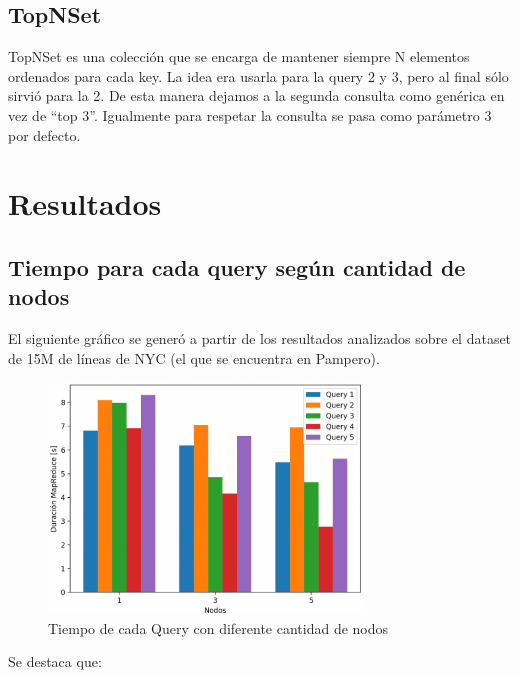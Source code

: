 \documentclass[a4paper,12pt]{article}
\def\FIG#1#2{%
	{\centering#1\par}
	#2}
\begin{document}
	\subsection{TopNSet}
	
	TopNSet es una colección que se encarga de mantener siempre N elementos ordenados para cada key. La idea era usarla para la query 2 y 3, pero al final sólo sirvió para la 2. De esta manera dejamos a la segunda consulta como genérica en vez de ``top 3''. Igualmente para respetar la consulta se pasa como parámetro 3 por defecto.
	
	
	\newpage
	\section{Resultados}
	
	\subsection{Tiempo para cada query según cantidad de nodos}
	
	El siguiente gráfico se generó a partir de los resultados analizados sobre el dataset de 15M de líneas de NYC (el que se encuentra en Pampero). 
	
	\begin{figure}[h!]%
		\FIG{\includegraphics[width=0.75\textwidth]{./queries_vs_nodos.png}}
		{\caption{Tiempo de cada Query con diferente cantidad de nodos}
			\label{fig1}}
	\end{figure}

	Se destaca que:
	
\end{document}
